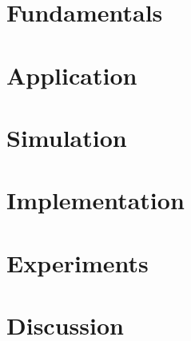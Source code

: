 
\chapter{Fundamentals}
\label{chp:basics}


\chapter{Application}
\label{chp:part}


\chapter{Simulation}
\label{chp:simulation}


\chapter{Implementation}
\label{chp:implementation}


\chapter{Experiments}
\label{chp:experiments}


\chapter{Discussion}
\label{chp:discussion}

